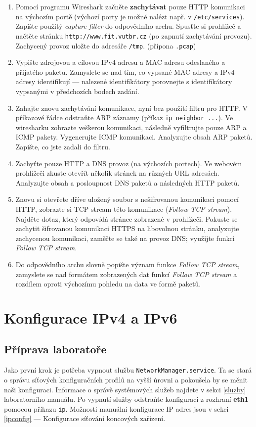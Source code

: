 \begin{enumerate}
  \item Pomocí programu Wireshark začněte \textbf{zachytávat} pouze HTTP komunikaci na výchozím portě
    (výchozí porty je možné nalézt např. v \texttt{/etc/services}). Zapište
    použitý \emph{capture filter} do odpovědního archu. Spusťte si prohlížeč a
    načtěte stránku \texttt{http://www.fit.vutbr.cz} (po zapnutí zachytávání
    provozu). Zachycený provoz uložte do adresáře \texttt{/tmp}. (přípona \texttt{.pcap})
\item Vypište zdrojovou a cílovou IPv4 adresu a MAC adresu odeslaného a
  přijatého paketu. Zamyslete se nad tím, co vypsané MAC adresy a IPv4 adresy
    identifikují --- nalezené identifikátory porovnejte s identifikátory
    vypsanými v předchozích bodech zadání.
\item Zahajte znovu zachytávání komunikace, nyní bez použití filtru pro HTTP. V příkazové řádce odstraňte ARP záznamy (příkaz \texttt{ip neighbor ...}). Ve wiresharku zobrazte veškerou komunikaci, následně vyfiltrujte pouze ARP a ICMP pakety. Vygenerujte ICMP komunikaci. Analyzujte obsah ARP paketů. Zapište, co jste zadali do filtru.
\item Zachyťte pouze HTTP a DNS provoz (na výchozích portech). Ve webovém prohlížeči zkuste otevřít několik stránek na různých URL adresách. Analyzujte obsah a posloupnost DNS paketů a následných HTTP paketů.
\item Znovu si otevřete dříve uložený soubor s nešifrovanou komunikaci pomocí
  HTTP, zobrazte si TCP stream této komunikace (\emph{Follow TCP stream}).
    Najděte dotaz, který odpovídá stránce zobrazené v prohlížeči. Pokuste se
    zachytit šifrovanou komunikaci HTTPS na libovolnou stránku, analyzujte
    zachycenou komunikaci, zaměřte se také na provoz DNS; využijte funkci \emph{Follow TCP stream}.
\item Do odpovědního archu slovně popište význam funkce \emph{Follow TCP stream},
    zamyslete se nad formátem zobrazených dat funkcí \emph{Follow TCP stream} a
    rozdílem oproti výchozímu pohledu na data ve formě paketů.
\end{enumerate}

\section{Konfigurace IPv4 a IPv6}

\subsection{Příprava laboratoře}
Jako první krok je potřeba vypnout službu \texttt{NetworkManager.service}.
Ta se stará o správu síťových konfiguračních profilů na vyšší úrovni a pokoušela by se měnit naši konfiguraci.
Informace o správě systémových služeb najdete v sekci \ref{sluzby} laboratorního manuálu.
Po vypnutí služby odstraňte konfiguraci z rozhraní \textbf{eth1} pomocou příkazu \texttt{ip}.
Možnosti manuální konfigurace IP adres jsou v sekci \ref{ipconfig} --- Konfigurace síťování koncových zařízení.

